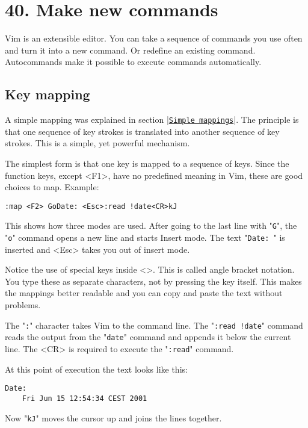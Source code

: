 \section{40. Make new commands}
Vim is an extensible editor.
You can take a sequence of commands you use often and turn it into a new command.
Or redefine an existing command.
Autocommands make it possible to execute commands automatically.
\subsection{Key mapping}
\label{Key mapping}
A simple mapping was explained in section |\hyperref[Simple mappings]{\texttt{Simple mappings}}|.
The principle is that one sequence of key strokes is translated into another sequence of key strokes.
This is a simple, yet powerful mechanism.

The simplest form is that one key is mapped to a sequence of keys.
Since the function keys, except <F1>, have no predefined meaning in Vim, these are good choices to map.
Example:

\begin{Verbatim}[samepage=true]
 :map <F2> GoDate: <Esc>:read !date<CR>kJ
\end{Verbatim}

This shows how three modes are used.
After going to the last line with "\texttt{G}", the "\texttt{o}" command opens a new line and starts Insert mode.
The text "\texttt{Date: }" is inserted and <Esc> takes you out of insert mode.

Notice the use of special keys inside <>.
This is called angle bracket notation.
You type these as separate characters, not by pressing the key itself.
This makes the mappings better readable and you can copy and paste the text without problems.

The "\texttt{:}" character takes Vim to the command line.
The "\texttt{:read !date}" command reads the output from the "\texttt{date}" command and appends it below the current line.
The <CR> is required to execute the "\texttt{:read}" command.

At this point of execution the text looks like this:

\begin{Verbatim}[samepage=true]
    Date:  
    Fri Jun 15 12:54:34 CEST 2001 
\end{Verbatim}

Now "\texttt{kJ}" moves the cursor up and joins the lines together.

